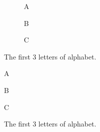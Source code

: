 \documentclass{article}
\begin{document}
\listoffigures

\begin{figure}[h!]
        \begin{subfigure}{0.24\linewidth}
            \caption{A}
        \end{subfigure}
        \hfill
        \begin{subfigure}{0.24\linewidth}
            \caption{B}
        \end{subfigure}
        \hfill
        \begin{subfigure}{0.24\linewidth}
            \caption{C}
        \end{subfigure}
        \caption{The first 3 letters of alphabet.}
\end{figure}

\noindent\begin{minipage}{\linewidth}
\captionsetup{type=figure}
        \begin{subfigure}{0.24\linewidth}
            \caption{A}
        \end{subfigure}
        \hfill
        \begin{subfigure}{0.24\linewidth}
            \caption{B}
        \end{subfigure}
        \hfill
        \begin{subfigure}{0.24\linewidth}
            \caption{C}
        \end{subfigure}
        \caption{The first 3 letters of alphabet.}
\end{minipage}

\begin{figure}[h!]
        \begin{minipage}{0.24\linewidth}
        \end{minipage}
        \hfill
        \begin{minipage}{.24\linewidth}
        \end{minipage}
        \hfill
        \begin{minipage}{.24\linewidth}
        \end{minipage}
        \caption{The first 3 letters of alphabet.}
\end{figure}
\end{document}
